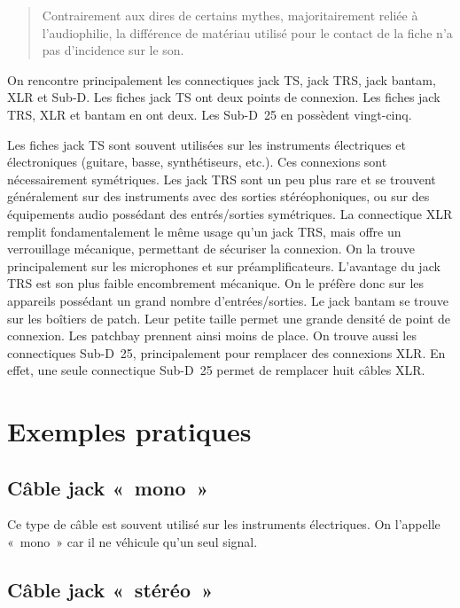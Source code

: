\documentclass[
]{book}
\begin{document}
\begin{quote}
Contrairement aux dires de certains mythes, majoritairement reliée à l'audiophilie, la différence de matériau utilisé pour le contact de la fiche n'a pas d'incidence sur le son.
\end{quote}

On rencontre principalement les connectiques jack TS, jack TRS, jack bantam, XLR et Sub-D. Les fiches jack TS ont deux points de connexion. Les fiches jack TRS, XLR et bantam en ont deux. Les Sub-D~25 en possèdent vingt-cinq.

Les fiches jack TS sont souvent utilisées sur les instruments électriques et électroniques (guitare, basse, synthétiseurs, etc.). Ces connexions sont nécessairement symétriques. Les jack TRS sont un peu plus rare et se trouvent généralement sur des instruments avec des sorties stéréophoniques, ou sur des équipements audio possédant des entrés/sorties symétriques. La connectique XLR remplit fondamentalement le même usage qu'un jack TRS, mais offre un verrouillage mécanique, permettant de sécuriser la connexion. On la trouve principalement sur les microphones et sur préamplificateurs. L'avantage du jack TRS est son plus faible encombrement mécanique. On le préfère donc sur les appareils possédant un grand nombre d'entrées/sorties. Le jack bantam se trouve sur les boîtiers de patch. Leur petite taille permet une grande densité de point de connexion. Les patchbay prennent ainsi moins de place. On trouve aussi les connectiques Sub-D~25, principalement pour remplacer des connexions XLR. En effet, une seule connectique Sub-D~25 permet de remplacer huit câbles XLR.

\hypertarget{exemples-pratiques}{%
\section{Exemples pratiques}\label{exemples-pratiques}}

\hypertarget{cuxe2ble-jack-mono}{%
\subsection{Câble jack «~mono~»}\label{cuxe2ble-jack-mono}}

Ce type de câble est souvent utilisé sur les instruments électriques. On l'appelle «~mono~» car il ne véhicule qu'un seul signal.

\hypertarget{cuxe2ble-jack-stuxe9ruxe9o}{%
\subsection{Câble jack «~stéréo~»}\label{cuxe2ble-jack-stuxe9ruxe9o}}
\end{document}
